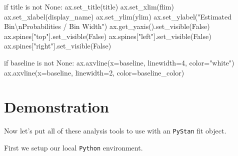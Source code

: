 \documentclass[
  letterpaper,
  DIV=11,
  numbers=noendperiod]{scrartcl}
\newenvironment{Shaded}{\begin{snugshade}}{\end{snugshade}}
\newcommand{\CharTok}[1]{\textcolor[rgb]{0.13,0.47,0.30}{#1}}
\newcommand{\ControlFlowTok}[1]{\textcolor[rgb]{0.00,0.23,0.31}{#1}}
\newcommand{\DecValTok}[1]{\textcolor[rgb]{0.68,0.00,0.00}{#1}}
\newcommand{\KeywordTok}[1]{\textcolor[rgb]{0.00,0.23,0.31}{#1}}
\newcommand{\NormalTok}[1]{\textcolor[rgb]{0.00,0.23,0.31}{#1}}
\newcommand{\OperatorTok}[1]{\textcolor[rgb]{0.37,0.37,0.37}{#1}}
\newcommand{\StringTok}[1]{\textcolor[rgb]{0.13,0.47,0.30}{#1}}
\newcommand{\VariableTok}[1]{\textcolor[rgb]{0.07,0.07,0.07}{#1}}
\begin{document}
\begin{Shaded}
\begin{Highlighting}[]
    \ControlFlowTok{if}\NormalTok{ title }\KeywordTok{is} \KeywordTok{not} \VariableTok{None}\NormalTok{:}
\NormalTok{      ax.set\_title(title)}
\NormalTok{    ax.set\_xlim(flim)}
\NormalTok{    ax.set\_xlabel(display\_name)}
\NormalTok{    ax.set\_ylim(ylim)}
\NormalTok{    ax.set\_ylabel(}\StringTok{"Estimated Bin}\CharTok{\textbackslash{}n}\StringTok{Probabilities / Bin Width"}\NormalTok{)}
\NormalTok{    ax.get\_yaxis().set\_visible(}\VariableTok{False}\NormalTok{)}
\NormalTok{    ax.spines[}\StringTok{"top"}\NormalTok{].set\_visible(}\VariableTok{False}\NormalTok{)}
\NormalTok{    ax.spines[}\StringTok{"left"}\NormalTok{].set\_visible(}\VariableTok{False}\NormalTok{)}
\NormalTok{    ax.spines[}\StringTok{"right"}\NormalTok{].set\_visible(}\VariableTok{False}\NormalTok{)}

  \ControlFlowTok{if}\NormalTok{ baseline }\KeywordTok{is} \KeywordTok{not} \VariableTok{None}\NormalTok{:}
\NormalTok{    ax.axvline(x}\OperatorTok{=}\NormalTok{baseline, linewidth}\OperatorTok{=}\DecValTok{4}\NormalTok{, color}\OperatorTok{=}\StringTok{"white"}\NormalTok{)}
\NormalTok{    ax.axvline(x}\OperatorTok{=}\NormalTok{baseline, linewidth}\OperatorTok{=}\DecValTok{2}\NormalTok{, color}\OperatorTok{=}\NormalTok{baseline\_color)}

\end{Highlighting}
\end{Shaded}

\section{Demonstration}\label{demonstration}

Now let's put all of these analysis tools to use with an \texttt{PyStan}
fit object.

First we setup our local \texttt{Python} environment.
\end{document}
